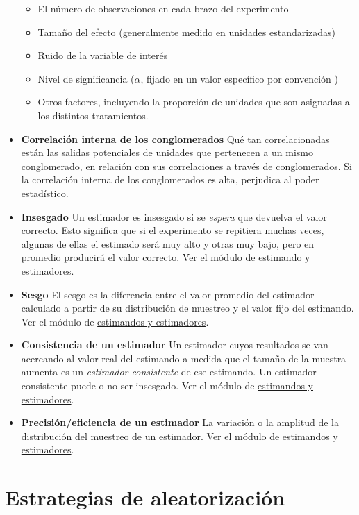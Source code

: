 \documentclass[
  12pt,
  spanish,
]{book}
\providecommand{\tightlist}{%
  \setlength{\itemsep}{0pt}\setlength{\parskip}{0pt}}
\begin{document}
\begin{itemize}
  \begin{itemize}
  \tightlist
  \item
    El número de observaciones en cada brazo del experimento
  \item
    Tamaño del efecto (generalmente medido en unidades estandarizadas)
  \item
    Ruido de la variable de interés
  \item
    Nivel de significancia (\(\alpha\), fijado en un valor específico por convención )
  \item
    Otros factores, incluyendo la proporción de unidades que son asignadas a los distintos tratamientos.
  \end{itemize}
\item
  \textbf{Correlación interna de los conglomerados} Qué tan correlacionadas están las salidas potenciales de unidades que pertenecen a un mismo conglomerado, en relación con sus correlaciones a través de conglomerados. Si la correlación interna de los conglomerados es alta, perjudica al poder estadístico.
\item
  \textbf{Insesgado} Un estimador es insesgado si se \emph{espera} que devuelva el valor correcto. Esto significa que si el experimento se repitiera muchas veces, algunas de ellas el estimado será muy alto y otras muy bajo, pero en promedio producirá el valor correcto. Ver el módulo de \href{estimandos-y-estimadores.html}{estimando y estimadores}.
\item
  \textbf{Sesgo} El sesgo es la diferencia entre el valor promedio del estimador calculado a partir de su distribución de muestreo y el valor fijo del estimando. Ver el módulo de \href{estimandos-y-estimadores.html}{estimandos y estimadores}.
\item
  \textbf{Consistencia de un estimador} Un estimador cuyos resultados se van acercando al valor real del estimando a medida que el tamaño de la muestra aumenta es un \emph{estimador consistente} de ese estimando. Un estimador consistente puede o no ser insesgado. Ver el módulo de \href{estimandos-y-estimadores.html}{estimandos y estimadores}.
\item
  \textbf{Precisión/eficiencia de un estimador} La variación o la amplitud de la distribución del muestreo de un estimador. Ver el módulo de \href{estimandos-y-estimadores.html}{estimandos y estimadores}.
\end{itemize}

\hypertarget{estrategias-de-aleatorizaciuxf3n}{%
\section{Estrategias de aleatorización}\label{estrategias-de-aleatorizaciuxf3n}}
\end{document}
